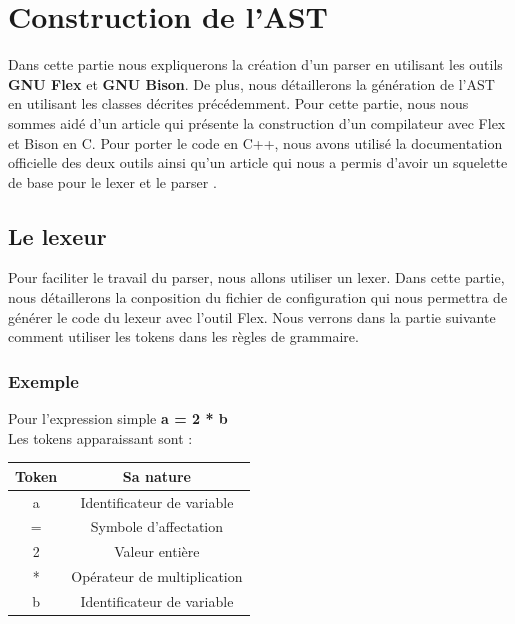 \documentclass[a4paper]{article}%
\begin{document}
\clearpage{}

\section{Construction de l'AST}

Dans cette partie nous expliquerons la création d'un \gls{parser} en utilisant les
outils \textbf{GNU Flex} et \textbf{GNU Bison}. De plus, nous détaillerons la
génération de l'AST en utilisant les classes décrites précédemment. Pour cette
partie, nous nous sommes aidé d'un article \cite{compilerFlexBison} qui présente
la construction d'un compilateur avec Flex et Bison en C. Pour porter le code en
C++, nous avons utilisé la documentation officielle des deux outils ainsi qu'un
article qui nous a permis d'avoir un squelette de base pour le \gls{lexer} et le
\gls{parser} \cite{cppparsing}.

\subsection{Le lexeur}

Pour faciliter le travail du \gls{parser}, nous allons utiliser un \gls{lexer}. Dans
cette partie, nous détaillerons la conposition du fichier de configuration qui
nous permettra de générer le code du lexeur avec l'outil Flex. Nous verrons dans
la partie suivante comment utiliser les tokens dans les règles de grammaire.

\subsubsection*{Exemple}

Pour l'expression simple \textbf{a = 2 * b} \\
Les tokens apparaissant sont : \\
\begin{center}
  \begin{tabular}{ | c | c | }
    \hline
    \textbf{Token} & \textbf{Sa nature} \\
    \hline
    a & Identificateur de variable \\
    \hline
    = & Symbole d'affectation \\
    \hline
    2 & Valeur entière \\
    \hline
    * & Opérateur de multiplication \\
    \hline
    b & Identificateur de variable \\
    \hline
  \end{tabular}
\end{center}
\end{document}
